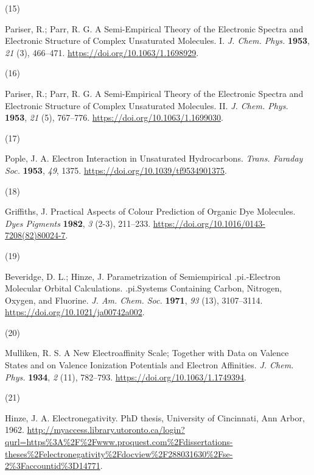 \documentclass[
  number,
  3p]{elsarticle}
\newlength{\cslhangindent}
\newlength{\csllabelwidth}
\newlength{\cslentryspacingunit} %
\newenvironment{CSLReferences}[2] %
 {%
  \setlength{\parindent}{0pt}
  \ifodd #1
  \let\oldpar\par
  \def\par{\hangindent=\cslhangindent\oldpar}
  \fi
  \setlength{\parskip}{#2\cslentryspacingunit}
 }%
 {}
\newcommand{\CSLLeftMargin}[1]{\parbox[t]{\csllabelwidth}{#1}}
\newcommand{\CSLRightInline}[1]{\parbox[t]{\linewidth - \csllabelwidth}{#1}\break}
\begin{document}
\begin{CSLReferences}{0}{0}
\leavevmode{}%
\CSLLeftMargin{(15) }%
\CSLRightInline{Pariser, R.; Parr, R. G. A {Semi}-{Empirical Theory} of
the {Electronic Spectra} and {Electronic Structure} of {Complex
Unsaturated Molecules}. {I}. \emph{J. Chem. Phys.} \textbf{1953},
\emph{21} (3), 466--471. \url{https://doi.org/10.1063/1.1698929}.}

\leavevmode{}%
\CSLLeftMargin{(16) }%
\CSLRightInline{Pariser, R.; Parr, R. G. A {Semi}-{Empirical Theory} of
the {Electronic Spectra} and {Electronic Structure} of {Complex
Unsaturated Molecules}. {II}. \emph{J. Chem. Phys.} \textbf{1953},
\emph{21} (5), 767--776. \url{https://doi.org/10.1063/1.1699030}.}

\leavevmode{}%
\CSLLeftMargin{(17) }%
\CSLRightInline{Pople, J. A. Electron Interaction in Unsaturated
Hydrocarbons. \emph{Trans. Faraday Soc.} \textbf{1953}, \emph{49}, 1375.
\url{https://doi.org/10.1039/tf9534901375}.}

\leavevmode{}%
\CSLLeftMargin{(18) }%
\CSLRightInline{Griffiths, J. Practical Aspects of Colour Prediction of
Organic Dye Molecules. \emph{Dyes Pigments} \textbf{1982}, \emph{3}
(2-3), 211--233. \url{https://doi.org/10.1016/0143-7208(82)80024-7}.}

\leavevmode{}%
\CSLLeftMargin{(19) }%
\CSLRightInline{Beveridge, D. L.; Hinze, J. Parametrization of
Semiempirical .pi.-Electron Molecular Orbital Calculations.
.pi.{Systems} Containing Carbon, Nitrogen, Oxygen, and Fluorine.
\emph{J. Am. Chem. Soc.} \textbf{1971}, \emph{93} (13), 3107--3114.
\url{https://doi.org/10.1021/ja00742a002}.}

\leavevmode{}%
\CSLLeftMargin{(20) }%
\CSLRightInline{Mulliken, R. S. A {New Electroaffinity Scale};
{Together} with {Data} on {Valence States} and on {Valence Ionization
Potentials} and {Electron Affinities}. \emph{J. Chem. Phys.}
\textbf{1934}, \emph{2} (11), 782--793.
\url{https://doi.org/10.1063/1.1749394}.}

\leavevmode{}%
\CSLLeftMargin{(21) }%
\CSLRightInline{Hinze, J. A. Electronegativity. PhD thesis, {University
of Cincinnati}, {Ann Arbor}, 1962.
\url{http://myaccess.library.utoronto.ca/login?qurl=https\%3A\%2F\%2Fwww.proquest.com\%2Fdissertations-theses\%2Felectronegativity\%2Fdocview\%2F288031630\%2Fse-2\%3Faccountid\%3D14771}.}


\end{CSLReferences}
\end{document}
